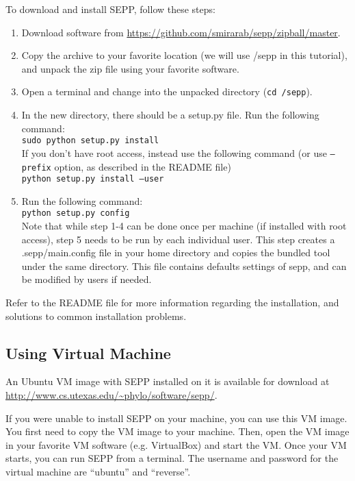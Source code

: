 \documentclass[11pt]{article} %
\newcommand{\sepp}{SEPP\xspace}
\newcommand{\ins}[1]{{\tt #1}}
\newcommand{\file}[1]{{\sf #1}}
\newcommand{\sepphome} {\file{{\raise.17ex\hbox{$\scriptstyle\sim$}}/sepp}\xspace}
\begin{document}
To download and install \sepp, follow these steps:

\begin{enumerate}
\item Download software from \url{https://github.com/smirarab/sepp/zipball/master}. 
\item Copy the archive to your favorite location (we will use \sepphome in this tutorial), and unpack the zip file using your favorite software. 
\item Open a terminal and change into the unpacked directory (\ins{cd \sepphome}). 
\item In the new directory, there should be a \file{setup.py} file. Run the following command:\\

\ins{sudo python setup.py install}\\

If you don't have root access, instead use the following command (or use \ins{--prefix} option, as described in the \file{README} file)\\

\ins{python setup.py install --user}

\item Run the following command:\\

\ins{python setup.py config}\\

Note that while step 1-4 can be done once per machine (if installed with root access), step 5 needs to be run by each individual user.
This step creates a \file{.sepp/main.config} file in your home directory and copies the bundled tool under the same directory. This file contains defaults settings of sepp, and can be modified by users if needed.

\end{enumerate}
Refer to the README file for more information regarding the installation, and solutions to common installation problems. 

\subsection{Using Virtual Machine}
An Ubuntu VM image with \sepp installed on it is available for download at \url{http://www.cs.utexas.edu/~phylo/software/sepp/}.  

If you were unable to install \sepp on your machine, you can use this VM image. You first need to copy the VM image to your machine. Then, open the VM image in your favorite VM software (e.g. VirtualBox) and start the VM. Once your VM starts, you can run \sepp from a terminal. The username and password for the virtual machine are ``ubuntu'' and ``reverse''.
\end{document}
